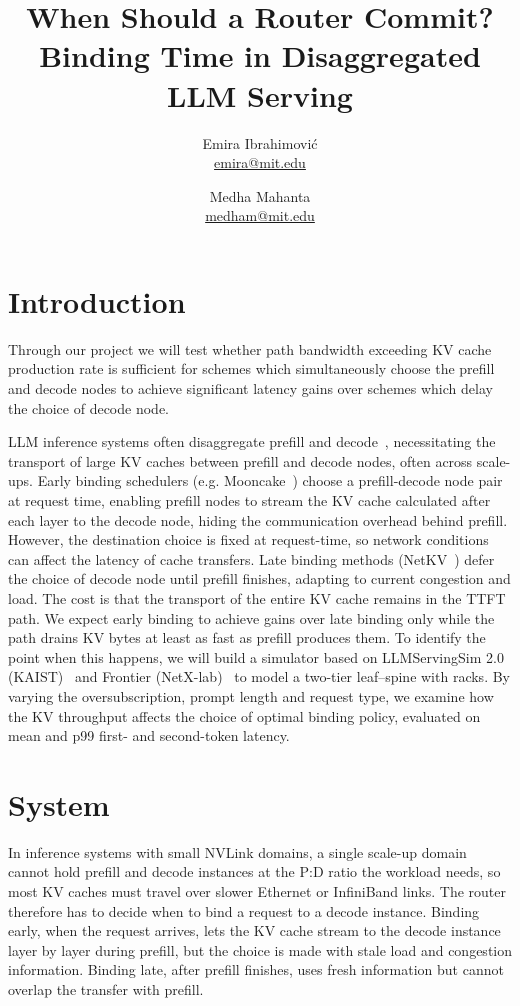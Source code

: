 \documentclass[a4paper]{article}
\title{When Should a Router Commit? Binding Time in Disaggregated LLM Serving }
\author{Emira Ibrahimović \\\href{mailto:emira@mit.edu}{emira@mit.edu} \and Medha Mahanta\\\href{mailto:medham@mit.edu}{medham@mit.edu}}
\begin{document}
\maketitle

\section{Introduction}

Through our project we will test whether path bandwidth exceeding KV cache production rate is sufficient for schemes which simultaneously choose the prefill and decode nodes to achieve significant latency gains over schemes which delay the choice of decode node.

LLM inference systems often disaggregate prefill and decode~\cite{zhong2024distserve, patel2024splitwise}, necessitating the transport of large KV caches between prefill and decode nodes, often across scale-ups. Early binding schedulers (e.g. Mooncake~\cite{qin2025mooncake}) choose a prefill-decode node pair at request time, enabling prefill nodes to stream the KV cache calculated after each layer to the decode node, hiding the communication overhead behind prefill. However, the destination choice is fixed at request-time, so network conditions can affect the latency of cache transfers. Late binding methods (NetKV~\cite{netkv}) defer the choice of decode node until prefill finishes, adapting to current congestion and load. The cost is that the transport of the entire KV cache remains in the TTFT path. We expect early binding to achieve gains over late binding only while the path drains KV bytes at least as fast as prefill produces them. To identify the point when this happens, we will build a simulator based on LLMServingSim 2.0 (KAIST)~\cite{llmservingsim2} and Frontier (NetX-lab)~\cite{frontier} to model a two-tier leaf--spine with racks. By varying the oversubscription, prompt length and request type, we examine how the KV throughput affects the choice of optimal binding policy, evaluated on mean and p99 first- and second-token latency. 

\section{System}

In inference systems with small NVLink domains, a single scale-up domain cannot hold prefill and decode instances at the P:D ratio the workload needs, so most KV caches must travel over slower Ethernet or InfiniBand links. The router therefore has to decide when to bind a request to a decode instance. Binding early, when the request arrives, lets the KV cache stream to the decode instance layer by layer during prefill, but the choice is made with stale load and congestion information. Binding late, after prefill finishes, uses fresh information but cannot overlap the transfer with prefill.
\end{document}
